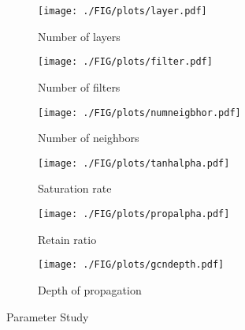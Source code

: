 \documentclass[sigconf]{acmart}
\begin{document}
\begin{figure}
        \begin{subfigure}[b]{0.23\textwidth}   
            \centering 
            \texttt{[image: ./FIG/plots/layer.pdf]}
            \caption[Number of layers]{{\small Number of layers}}    
            \label{fig:6a}
        \end{subfigure}
        \hfill
        \begin{subfigure}[b]{0.23\textwidth}   
            \centering 
            \texttt{[image: ./FIG/plots/filter.pdf]}
            \caption[Number of filters]{{\small Number of filters}}    
            \label{fig:6b}
        \end{subfigure}
        \newline
        \begin{subfigure}[b]{0.23\textwidth}   
            \centering 
            \texttt{[image: ./FIG/plots/numneigbhor.pdf]}
            \caption[Number of neighbors]{{\small Number of neighbors}}    
            \label{fig:6c}
        \end{subfigure}
        \hfill
        \begin{subfigure}[b]{0.23\textwidth}   
            \centering 
            \texttt{[image: ./FIG/plots/tanhalpha.pdf]}
            \caption[Saturation rate]{{\small Saturation rate}}    
            \label{fig:6d}
        \end{subfigure}
        \newline
        \begin{subfigure}[b]{0.23\textwidth}   
            \centering 
            \texttt{[image: ./FIG/plots/propalpha.pdf]}
            \caption[Retain ratio]{{\small Retain ratio}}    
            \label{fig:6e}
        \end{subfigure}
        \hfill
        \begin{subfigure}[b]{0.23\textwidth}   
            \centering 
            \texttt{[image: ./FIG/plots/gcndepth.pdf]}
            \caption[Depth of propagation]{{\small Depth of propagation}}    
            \label{fig:6f}
        \end{subfigure}
        \caption[Parameter Study]
        {\small Parameter Study} 
        \label{fig:para}
\end{figure}
\end{document}
